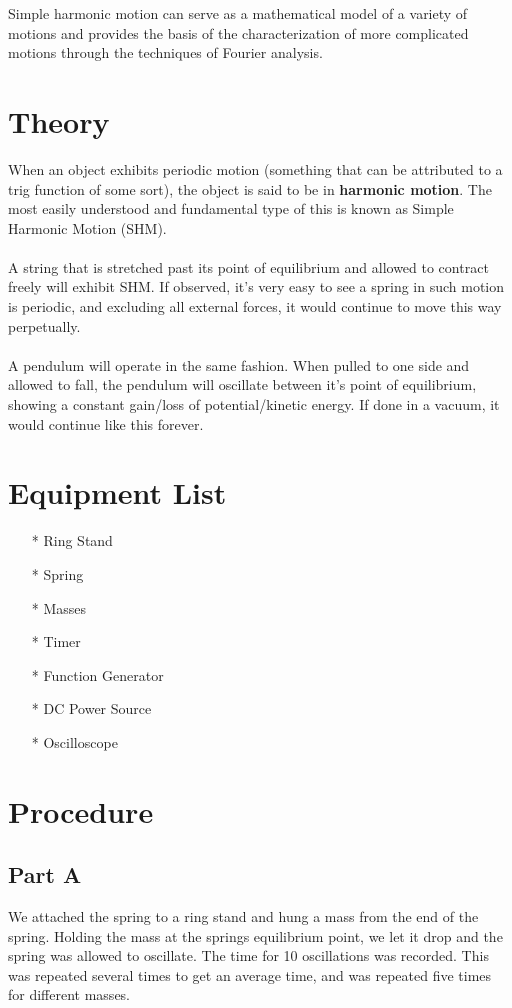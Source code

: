 \documentclass[twocolumn]{article}
\begin{document}
Simple harmonic motion can serve as a mathematical model of a variety of motions and provides the basis of the characterization of more complicated motions through the techniques of Fourier analysis.

\section{Theory} %
\label{sec:theory}
When an object exhibits periodic motion (something that can be attributed to a trig function of some sort), the object is said to be in \textbf{harmonic motion}. The most easily understood and fundamental type of this is known as Simple Harmonic Motion (SHM).\\
\\
A string that is stretched past its point of equilibrium and allowed to contract freely will exhibit SHM. If observed, it's very easy to see a spring in such motion is periodic, and excluding all external forces, it would continue to move this way perpetually.\\
\\
A pendulum will operate in the same fashion. When pulled to one side and allowed to fall, the pendulum will oscillate between it's point of equilibrium, showing a constant gain/loss of potential/kinetic energy. If done in a vacuum, it would continue like this forever.


\section{Equipment List} %
\label{sec:equipment_list}
\begin{itemize}
\item[*] Ring Stand
\item[*] Spring
\item[*] Masses
\item[*] Timer
\item[*] Function Generator
\item[*] DC Power Source
\item[*] Oscilloscope
\end{itemize}



\section{Procedure}\label{sec:procedure}
\subsection{Part A}\label{sub:part_a}
We attached the spring to a ring stand and hung a mass from the end of the spring. Holding the mass at the springs equilibrium point, we let it drop and the spring was allowed to oscillate. The time for 10 oscillations was recorded. This was repeated several times to get an average time, and was repeated five times for different masses.
\end{document}
